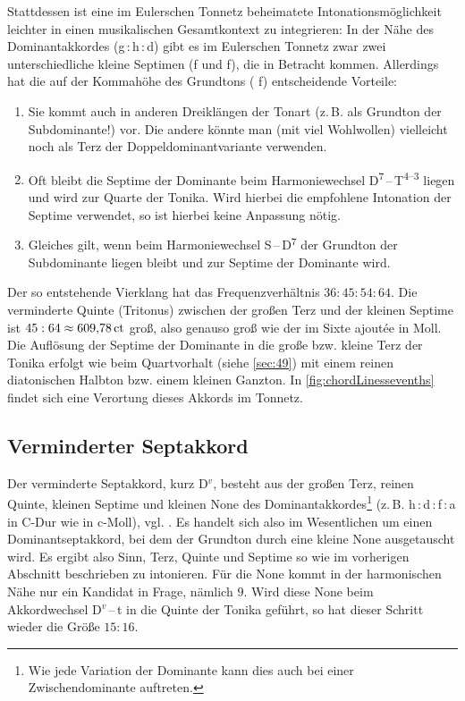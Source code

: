 Stattdessen ist eine im Eulerschen Tonnetz beheimatete Intonationsmöglichkeit
leichter in einen musikalischen Gesamtkontext zu integrieren: In der Nähe des
Dominantakkordes (g\,:\,\naturalm h\,:\,d) gibt es im Eulerschen Tonnetz zwar
zwei unterschiedliche kleine Septimen (\natural f und \naturalp f), die in
Betracht kommen.  Allerdings hat die auf der Kommahöhe des Grundtons (\natural
f) entscheidende Vorteile:
\begin{enumerate}
\item Sie kommt auch in anderen Dreiklängen der Tonart (z.\,B. als Grundton der
  Subdominante!) vor.  Die andere könnte man (mit viel Wohlwollen) vielleicht
  noch als Terz der Doppeldominantvariante verwenden.
\item Oft bleibt die Septime der Dominante beim Harmoniewechsel
  D\textsuperscript{$7$}\,–\,T\textsuperscript{$4$–$3$} liegen und wird zur
  Quarte der Tonika.  Wird hierbei die empfohlene Intonation der Septime
  verwendet, so ist hierbei keine Anpassung nötig.
\item Gleiches gilt, wenn beim Harmoniewechsel S\,–\,D\textsuperscript{$7$} der
  Grundton der Subdominante liegen bleibt und zur Septime der Dominante wird.
\end{enumerate}
Der so entstehende Vierklang hat das Frequenzverhältnis $36:45:54:64$. Die
verminderte Quinte (Tritonus) zwischen der großen Terz und der kleinen Septime
ist $45:64\approx 609{,}78\,\text{ct}$ groß, also genauso groß wie der im Sixte
ajoutée in Moll. Die Auflösung der Septime der Dominante in die große bzw.
kleine Terz der Tonika erfolgt wie beim Quartvorhalt (siehe \cref{sec:49}) mit
einem reinen diatonischen Halbton bzw. einem kleinen Ganzton. In
\cref{fig:chordLinessevenths} findet sich eine Verortung dieses Akkords im
Tonnetz.

\subsection{Verminderter Septakkord}
\label{sec:dim7syn}


Der verminderte Septakkord, kurz D$^v$, besteht aus der großen Terz, reinen
Quinte, kleinen Septime und kleinen None des Dominantakkordes\footnote{Wie jede
  Variation der Dominante kann dies auch bei einer Zwischendominante auftreten.}
(z.\,B. h\,:\,d\,:\,f\,:\,\flat a in C-Dur wie in c-Moll),
vgl. \cite[{}11.1]{Skript}. Es handelt sich also im Wesentlichen um einen
Dominantseptakkord, bei dem der Grundton durch eine kleine None ausgetauscht
wird. Es ergibt also Sinn, Terz, Quinte und Septime so wie im vorherigen
Abschnitt beschrieben zu intonieren. Für die None kommt in der harmonischen Nähe
nur ein Kandidat in Frage, nämlich \flatp $9$.  Wird diese None beim
Akkordwechsel D$^v$\,–\,t in die Quinte der Tonika geführt, so hat dieser
Schritt wieder die Größe $15:16$.

